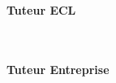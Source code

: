 \documentclass[../main/main.tex]{subfiles}
\begin{document}
\begin{titlepage}
    \begin{minipage}{0.4\textwidth}
        \begin{flushleft}
            \textbf{Tuteur ECL}\\
            {\scshape \schoolTutorLastName{}}~\textit{\schoolTutorFirstName{}}\\
            \href{mailto:\schoolTutorEmail}{\schoolTutorEmail}\\
        \end{flushleft}
    \end{minipage}
    \hfill
    \begin{minipage}{0.4\textwidth}
        \begin{flushright}
            \textbf{Tuteur Entreprise}\\
            {\scshape \companyTutorLastName{}}~\textit{\companyTutorFirstName{}}\\
            \href{mailto:\companyTutorEmail}{\companyTutorEmail}\\
        \end{flushright}
    \end{minipage}
\end{titlepage}

\hypersetup{pageanchor=true}
\restoregeometry{}
\end{document}
